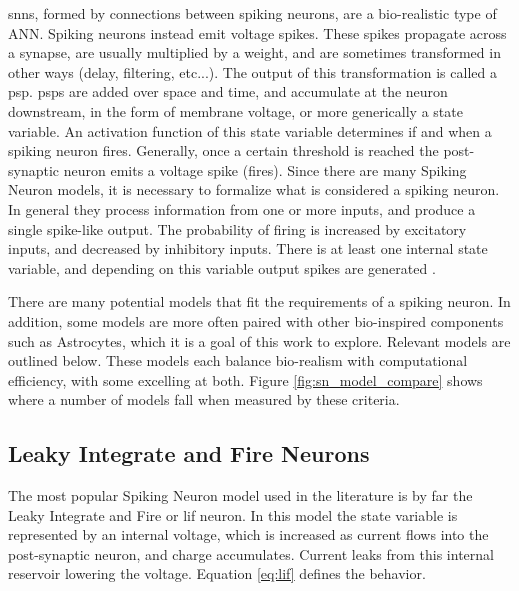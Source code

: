     \Glspl{snn}, formed by connections between spiking neurons, are a bio-realistic
    type of ANN. Spiking neurons instead emit voltage spikes. These spikes
    propagate across a synapse, are usually multiplied by a weight, and are
    sometimes transformed in other ways (delay, filtering, etc...). The output
    of this transformation is called a \Gls{psp}. \Glspl{psp} are
    added over space and time, and accumulate at the neuron downstream, in the
    form of membrane voltage, or more generically a state variable. An
    activation function of this state variable determines if and when a spiking
    neuron fires. Generally, once a certain threshold is reached the
    post-synaptic neuron emits a voltage spike (fires). Since there are many
    Spiking Neuron models, it is necessary to formalize what is considered a
    spiking neuron. In general they process information from one or more inputs,
    and produce a single spike-like output. The probability of firing is
    increased by excitatory inputs, and decreased by inhibitory inputs. There is
    at least one internal state variable, and depending on this variable output
    spikes are generated \cite{ponulak_2011}.
    
    There are many potential models that fit the requirements of a spiking
    neuron. In addition, some models are more often paired with other
    bio-inspired components such as Astrocytes, which it is a goal of this work
    to explore. Relevant models are outlined below. These models each balance
    bio-realism with computational efficiency, with some excelling at
    both. Figure \ref{fig:sn_model_compare} shows where a number of models fall
    when measured by these criteria.
    

    \subsection{Leaky Integrate and Fire Neurons}
    The most popular Spiking Neuron model used in the literature is by far the
    Leaky Integrate and Fire or \Gls{lif} neuron. In this model the state variable is
    represented by an internal voltage, which is increased as current flows into
    the post-synaptic neuron, and charge accumulates. Current leaks from this
    internal reservoir lowering the voltage. Equation \ref{eq:lif} defines the
    behavior.

